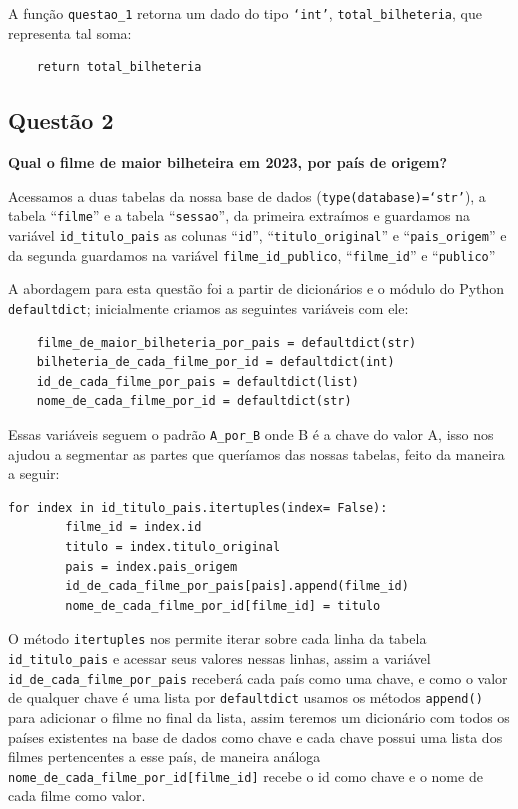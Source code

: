 \documentclass[12pt, a4paper]{article}
\begin{document}
A função \texttt{questao\_1} retorna um dado do tipo \texttt{`int'}, \texttt{total\_bilheteria}, que representa tal soma:
\begin{verbatim}
    return total_bilheteria
\end{verbatim}

\subsection{Questão 2}
\textbf{Qual o filme de maior bilheteira em 2023, por país de origem?}

Acessamos a duas tabelas da nossa base de dados (\texttt{type(database)=`str'}), a tabela ``\texttt{filme}'' e a tabela ``\texttt{sessao}'', da primeira extraímos e guardamos na variável \texttt{id\_titulo\_pais} as colunas ``\texttt{id}'', ``\texttt{titulo\_original}'' e ``\texttt{pais\_origem}'' e da segunda guardamos na variável \texttt{filme\_id\_publico}, ``\texttt{filme\_id}'' e ``\texttt{publico}''

A abordagem para esta questão foi a partir de dicionários e o módulo do Python \texttt{defaultdict};
inicialmente criamos as seguintes variáveis com ele:

\begin{verbatim}
    filme_de_maior_bilheteria_por_pais = defaultdict(str)
    bilheteria_de_cada_filme_por_id = defaultdict(int)
    id_de_cada_filme_por_pais = defaultdict(list)
    nome_de_cada_filme_por_id = defaultdict(str)
\end{verbatim}

Essas variáveis seguem o padrão \texttt{A\_por\_B} onde B é a chave do valor A, isso nos ajudou a segmentar as partes que queríamos das nossas tabelas, feito da maneira a seguir:

\begin{verbatim}
for index in id_titulo_pais.itertuples(index= False):
        filme_id = index.id
        titulo = index.titulo_original
        pais = index.pais_origem
        id_de_cada_filme_por_pais[pais].append(filme_id)
        nome_de_cada_filme_por_id[filme_id] = titulo
\end{verbatim}

O método \texttt{itertuples} nos permite iterar sobre cada linha da tabela \verb|id_titulo_pais| e acessar seus valores nessas linhas, assim a variável \verb|id_de_cada_filme_por_pais| receberá cada país como uma chave, e como o valor de qualquer chave é uma lista por \texttt{defaultdict} usamos os métodos \texttt{append()} para adicionar o filme no final da lista, assim teremos um dicionário com todos os países existentes na base de dados como chave e cada chave possui uma lista dos filmes pertencentes a esse país, de maneira análoga \verb| nome_de_cada_filme_por_id[filme_id]| recebe o id como chave e o nome de cada filme como valor.
\end{document}
